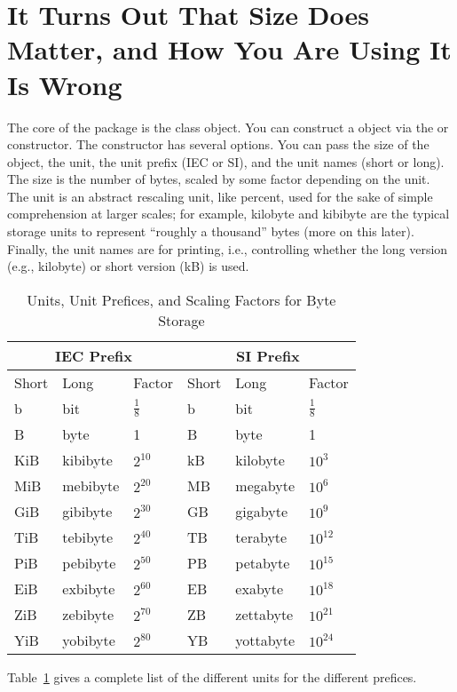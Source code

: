 \section{It Turns Out That Size Does Matter, and How You Are Using It Is Wrong}
\label{howuse}

The core of the  package is the  class object.  You can construct a  object via the  or  constructor.  The constructor has several options.  You can pass the size of the object, the unit, the unit prefix (IEC or SI), and the unit names (short or long).  The size is the number of bytes, scaled by some factor depending on the unit.  The unit is an abstract rescaling unit, like percent, used for the sake of simple comprehension at larger scales; for example, kilobyte and kibibyte are the typical storage units to represent ``roughly a thousand'' bytes (more on this later).  Finally, the unit names are for printing, i.e., controlling whether the long version (e.g., kilobyte) or short version (kB) is used.
\begin{table}[ht]
  \centering
  \begin{tabular}{|lll|lll|}\hline
    \multicolumn{3}{|c}{IEC Prefix} & \multicolumn{3}{|c|}{SI Prefix} \\\hline
    Short & Long & Factor & Short & Long & Factor\\\hline
    b & bit & $\frac{1}{8}$ & b & bit & $\frac{1}{8}$\\
    B & byte & 1 & B & byte & 1\\
    KiB & kibibyte & $2^{10}$ & kB & kilobyte & $10^3$\\
    MiB & mebibyte & $2^{20}$ & MB & megabyte & $10^6$\\
    GiB & gibibyte & $2^{30}$ & GB & gigabyte & $10^9$\\
    TiB & tebibyte & $2^{40}$ & TB & terabyte & $10^{12}$\\
    PiB & pebibyte & $2^{50}$ & PB & petabyte & $10^{15}$\\
    EiB & exbibyte & $2^{60}$ & EB & exabyte & $10^{18}$\\
    ZiB & zebibyte & $2^{70}$ & ZB & zettabyte & $10^{21}$\\
    YiB & yobibyte & $2^{80}$ & YB & yottabyte & $10^{24}$\\\hline
  \end{tabular}
  \caption{Units, Unit Prefices, and Scaling Factors for Byte Storage}
  \label{tab:units}
\end{table}
Table~\ref{tab:units} gives a complete list of the different units for the different prefices.

